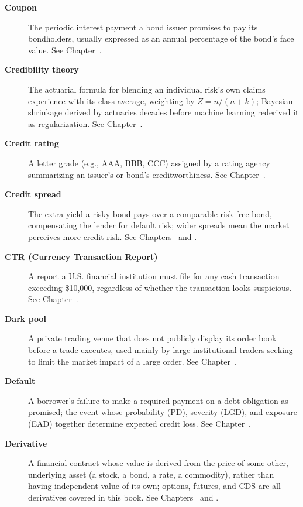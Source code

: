 \documentclass[../ai_in_finance]{subfiles}
\begin{document}
\begin{description}
\item[\textbf{Coupon}] The periodic interest payment a bond issuer promises to pay its bondholders, usually expressed as an annual percentage of the bond's face value. See Chapter~.

\item[\textbf{Credibility theory}] The actuarial formula for blending an individual risk's own claims experience with its class average, weighting by $Z = n/(n+k)$; Bayesian shrinkage derived by actuaries decades before machine learning rederived it as regularization. See Chapter~.

\item[\textbf{Credit rating}] A letter grade (e.g., AAA, BBB, CCC) assigned by a rating agency summarizing an issuer's or bond's creditworthiness. See Chapter~.

\item[\textbf{Credit spread}] The extra yield a risky bond pays over a comparable risk-free bond, compensating the lender for default risk; wider spreads mean the market perceives more credit risk. See Chapters~ and .

\item[\textbf{CTR (Currency Transaction Report)}] A report a U.S. financial institution must file for any cash transaction exceeding \$10,000, regardless of whether the transaction looks suspicious. See Chapter~.

\item[\textbf{Dark pool}] A private trading venue that does not publicly display its order book before a trade executes, used mainly by large institutional traders seeking to limit the market impact of a large order. See Chapter~.

\item[\textbf{Default}] A borrower's failure to make a required payment on a debt obligation as promised; the event whose probability (PD), severity (LGD), and exposure (EAD) together determine expected credit loss. See Chapter~.

\item[\textbf{Derivative}] A financial contract whose value is derived from the price of some other, underlying asset (a stock, a bond, a rate, a commodity), rather than having independent value of its own; options, futures, and CDS are all derivatives covered in this book. See Chapters~ and .


\end{description}
\end{document}
